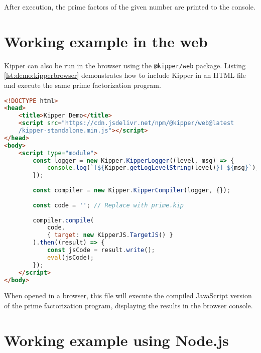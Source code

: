 After execution, the prime factors of the given number are printed to the console.

\section{Working example in the web}

Kipper can also be run in the browser using the \texttt{@kipper/web} package. Listing \ref{lst:demo:kipperbrowser} demonstrates how to include Kipper in an HTML file and execute the same prime factorization program.

\begin{lstlisting}[language=HTML,caption=Running Kipper in the browser, label=lst:demo:kipperbrowser]
<!DOCTYPE html>
<head>
	<title>Kipper Demo</title>
	<script src="https://cdn.jsdelivr.net/npm/@kipper/web@latest
	/kipper-standalone.min.js"></script>
</head>
<body>
	<script type="module">
		const logger = new Kipper.KipperLogger((level, msg) => {
			console.log(`[${Kipper.getLogLevelString(level)}] ${msg}`);
		});
		
		const compiler = new Kipper.KipperCompiler(logger, {});
		
		const code = ''; // Replace with prime.kip
		
		compiler.compile(
			code, 
			{ target: new KipperJS.TargetJS() }
		).then((result) => {
			const jsCode = result.write();
			eval(jsCode);
		});
	</script>
</body>
\end{lstlisting}

When opened in a browser, this file will execute the compiled JavaScript version of the prime factorization program, displaying the results in the browser console.

\section{Working example using Node.js}


